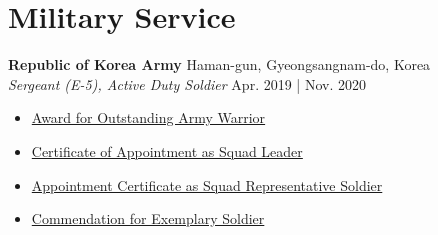 \documentclass[a4paper,9pt]{extarticle}
\begin{document}
\section*{Military Service}
\noindent
\textbf{\large{Republic of Korea Army}} \hfill Haman-gun, Gyeongsangnam-do, Korea \\
\textit{Sergeant (E-5), Active Duty Soldier} \hfill Apr. 2019 | Nov. 2020
\begin{itemize}
    \item \href{https://github.com/user-attachments/assets/584d8f84-5bbe-4a71-9ae3-bda5ce40bd6f}{Award for Outstanding Army Warrior}  
    \item \href{https://github.com/user-attachments/assets/d3b82b44-dff0-4d58-a944-747f46f8a50e}{Certificate of Appointment as Squad Leader}
    \item \href{https://github.com/user-attachments/assets/8565647d-3609-4866-8e18-fbdf9a9e227c}{Appointment Certificate as Squad Representative Soldier}
    \item \href{https://github.com/user-attachments/assets/f4f76912-92a7-440e-b8a2-4ce52b1ec39a}{Commendation for Exemplary Soldier}
\end{itemize}




\end{document}
